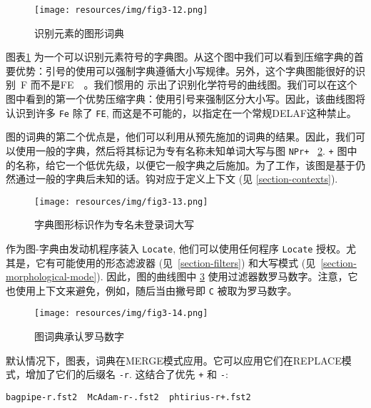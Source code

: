 \begin{figure}[!p]
\begin{center}
\texttt{[image: resources/img/fig3-12.png]}
\caption{识别元素的图形词典\label{elements}}
\end{center}
\end{figure}

\bigskip
\noindent 图表\ref{elements} 为一个可以识别元素符号的字典图。从这个图中我们可以看到压缩字典的首要优势：引号的使用可以强制字典遵循大小写规律。另外，这个字典图能很好的识别\ F 而不是\　FE　。我们惯用的
示出了识别化学符号的曲线图。我们可以在这个图中看到的第一个优势压缩字典：使用引号来强制区分大小写。因此，该曲线图将认识到许多 \verb+Fe+
除了 \verb+FE+, 而这是不可能的，以指定在一个常规DELAF这种禁止。

\bigskip
\noindent 图的词典的第二个优点是，他们可以利用从预先施加的词典的结果。因此，我们可以使用一般的字典，然后将其标记为专有名称未知单词大写与图 \verb$NPr+$ ~\ref{graph-NPr}.  \verb$+$ 图中的名称，给它一个低优先级，以便它一般字典之后施加。为了工作，该图是基于仍然通过一般的字典后未知的话。钩对应于定义上下文 (见 \ref{section-contexts}).

\begin{figure}[!h]
\begin{center}
\texttt{[image: resources/img/fig3-13.png]}
\caption{字典图形标识作为专名未登录词大写
\label{graph-NPr}}
\end{center}
\end{figure}

\bigskip
\noindent 作为图-字典由发动机程序装入 \verb+Locate+,
他们可以使用任何程序 \verb+Locate+ 授权。尤其是，它有可能使用的形态滤波器 (见~\ref{section-filters}) 和大写模式 (见~\ref{section-morphological-mode}).
因此，图的曲线图中 \ref{graph-CR} 使用过滤器数罗马数字。注意，它也使用上下文来避免，例如，随后当由撇号即 \verb+C+ 被取为罗马数字。

\begin{figure}[!p]
\begin{center}
\texttt{[image: resources/img/fig3-14.png]}
\caption{图词典承认罗马数字\label{graph-CR}}
\end{center}
\end{figure}

\bigskip
\noindent 默认情况下，图表，词典在MERGE模式应用。它可以应用它们在REPLACE模式，增加了它们的后缀名 \verb+-r+. 这结合了优先 \verb-+- 和 \verb+-+:

\bigskip
\verb?bagpipe-r.fst2  McAdam-r-.fst2  phtirius-r+.fst2?


